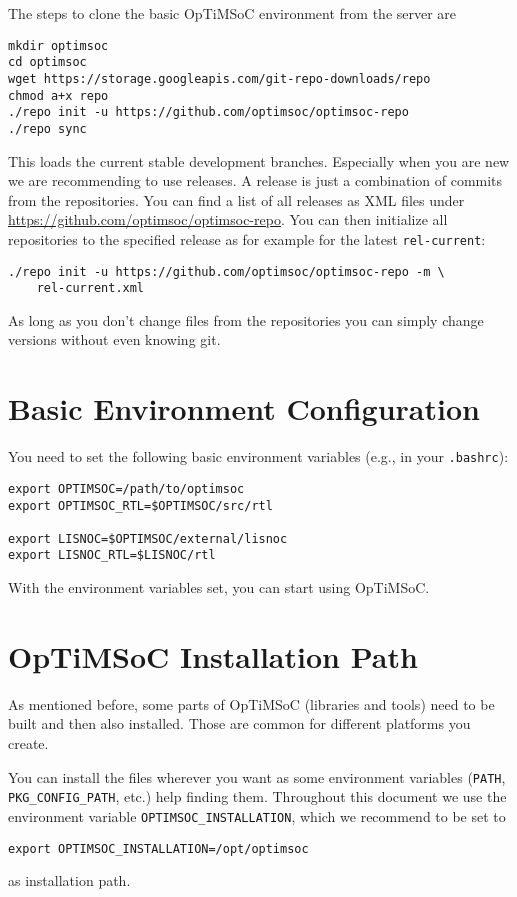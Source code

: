 The steps to clone the basic OpTiMSoC environment from the server are

\begin{lstlisting}
mkdir optimsoc
cd optimsoc
wget https://storage.googleapis.com/git-repo-downloads/repo
chmod a+x repo
./repo init -u https://github.com/optimsoc/optimsoc-repo
./repo sync
\end{lstlisting}

This loads the current stable development branches. Especially when
you are new we are recommending to use releases. A release is just a
combination of commits from the repositories. You can find a list of
all releases as XML files under
\url{https://github.com/optimsoc/optimsoc-repo}. You can then
initialize all repositories to the specified release as for example
for the latest \verb|rel-current|:

\begin{lstlisting}
./repo init -u https://github.com/optimsoc/optimsoc-repo -m \
    rel-current.xml
\end{lstlisting}

As long as you don't change files from the repositories you can simply
change versions without even knowing git.

\section{Basic Environment Configuration}

You need to set the following basic environment variables (e.g., in your
\verb|.bashrc|):

\begin{lstlisting}
export OPTIMSOC=/path/to/optimsoc
export OPTIMSOC_RTL=$OPTIMSOC/src/rtl

export LISNOC=$OPTIMSOC/external/lisnoc
export LISNOC_RTL=$LISNOC/rtl
\end{lstlisting}

With the environment variables set, you can start using OpTiMSoC.

\section{OpTiMSoC Installation Path}

As mentioned before, some parts of OpTiMSoC (libraries and tools) need
to be built and then also installed. Those are common for different
platforms you create.

You can install the files wherever you want as some environment
variables (\verb|PATH|, \verb|PKG_CONFIG_PATH|, etc.) help finding
them. Throughout this document we use the environment variable
\verb|OPTIMSOC_INSTALLATION|, which we recommend to be set to
\begin{lstlisting}
export OPTIMSOC_INSTALLATION=/opt/optimsoc
\end{lstlisting}
as installation path.

